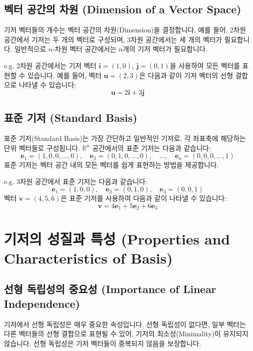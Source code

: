 \documentclass[12pt]{article}
\begin{document}
\subsection{벡터 공간의 차원 (Dimension of a Vector Space)}

\noindent 기저 벡터들의 개수는 벡터 공간의 차원(Dimension)을 결정합니다. 예를 들어, 2차원 공간에서 기저는 두 개의 벡터로 구성되며, 3차원 공간에서는 세 개의 벡터가 필요합니다. 일반적으로 \( n \)-차원 벡터 공간에서는 \( n \)개의 기저 벡터가 필요합니다.

\vspace{1\baselineskip}
\noindent {} e.g. 2차원 공간에서는 기저 벡터 \(\mathbf{i} = (1, 0)\), \(\mathbf{j} = (0, 1)\)을 사용하여 모든 벡터를 표현할 수 있습니다. 예를 들어, 벡터 \(\mathbf{u} = (2, 3)\)은 다음과 같이 기저 벡터의 선형 결합으로 나타낼 수 있습니다:
\[
  \mathbf{u} = 2\mathbf{i} + 3\mathbf{j}
\]

\subsection{표준 기저 (Standard Basis)}

\noindent 표준 기저(Standard Basis)는 가장 간단하고 일반적인 기저로, 각 좌표축에 해당하는 단위 벡터들로 구성됩니다. \( \mathbb{R}^n \) 공간에서의 표준 기저는 다음과 같습니다:
\[
  \mathbf{e}_1 = (1, 0, 0, \dots, 0), \quad \mathbf{e}_2 = (0, 1, 0, \dots, 0), \quad \dots, \quad \mathbf{e}_n = (0, 0, 0, \dots, 1)
\]
표준 기저는 벡터 공간 내의 모든 벡터를 쉽게 표현하는 방법을 제공합니다.

\vspace{1\baselineskip}
\noindent {} e.g. 3차원 공간에서 표준 기저는 다음과 같습니다:
\[
  \mathbf{e}_1 = (1, 0, 0), \quad \mathbf{e}_2 = (0, 1, 0), \quad \mathbf{e}_3 = (0, 0, 1)
\]
벡터 \(\mathbf{v} = (4, 5, 6)\)은 표준 기저를 사용하여 다음과 같이 나타낼 수 있습니다:
\[
  \mathbf{v} = 4\mathbf{e}_1 + 5\mathbf{e}_2 + 6\mathbf{e}_3
\]

\section{기저의 성질과 특성 (Properties and Characteristics of Basis)}

\subsection{선형 독립성의 중요성 (Importance of Linear Independence)}

\noindent 기저에서 선형 독립성은 매우 중요한 속성입니다. 선형 독립성이 없다면, 일부 벡터는 다른 벡터들의 선형 결합으로 표현될 수 있어, 기저의 최소성(Minimality)이 유지되지 않습니다. 선형 독립성은 기저 벡터들이 중복되지 않음을 보장합니다.
\end{document}
